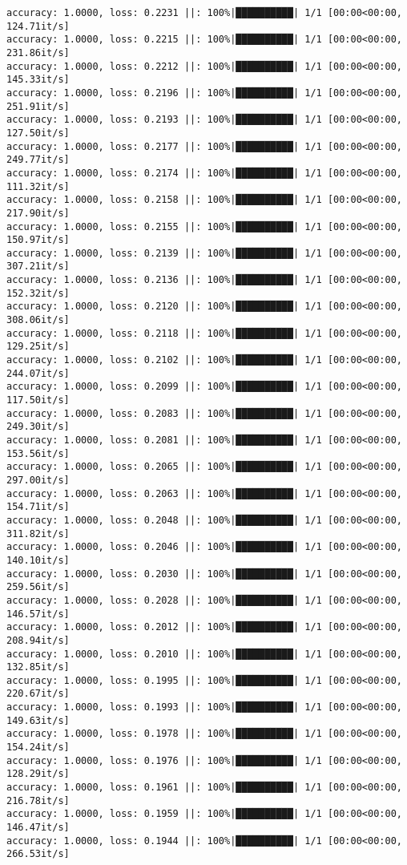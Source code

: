 \documentclass[
]{article}
\begin{document}
\begin{verbatim}
accuracy: 1.0000, loss: 0.2231 ||: 100%|██████████| 1/1 [00:00<00:00, 124.71it/s]
accuracy: 1.0000, loss: 0.2215 ||: 100%|██████████| 1/1 [00:00<00:00, 231.86it/s]
accuracy: 1.0000, loss: 0.2212 ||: 100%|██████████| 1/1 [00:00<00:00, 145.33it/s]
accuracy: 1.0000, loss: 0.2196 ||: 100%|██████████| 1/1 [00:00<00:00, 251.91it/s]
accuracy: 1.0000, loss: 0.2193 ||: 100%|██████████| 1/1 [00:00<00:00, 127.50it/s]
accuracy: 1.0000, loss: 0.2177 ||: 100%|██████████| 1/1 [00:00<00:00, 249.77it/s]
accuracy: 1.0000, loss: 0.2174 ||: 100%|██████████| 1/1 [00:00<00:00, 111.32it/s]
accuracy: 1.0000, loss: 0.2158 ||: 100%|██████████| 1/1 [00:00<00:00, 217.90it/s]
accuracy: 1.0000, loss: 0.2155 ||: 100%|██████████| 1/1 [00:00<00:00, 150.97it/s]
accuracy: 1.0000, loss: 0.2139 ||: 100%|██████████| 1/1 [00:00<00:00, 307.21it/s]
accuracy: 1.0000, loss: 0.2136 ||: 100%|██████████| 1/1 [00:00<00:00, 152.32it/s]
accuracy: 1.0000, loss: 0.2120 ||: 100%|██████████| 1/1 [00:00<00:00, 308.06it/s]
accuracy: 1.0000, loss: 0.2118 ||: 100%|██████████| 1/1 [00:00<00:00, 129.25it/s]
accuracy: 1.0000, loss: 0.2102 ||: 100%|██████████| 1/1 [00:00<00:00, 244.07it/s]
accuracy: 1.0000, loss: 0.2099 ||: 100%|██████████| 1/1 [00:00<00:00, 117.50it/s]
accuracy: 1.0000, loss: 0.2083 ||: 100%|██████████| 1/1 [00:00<00:00, 249.30it/s]
accuracy: 1.0000, loss: 0.2081 ||: 100%|██████████| 1/1 [00:00<00:00, 153.56it/s]
accuracy: 1.0000, loss: 0.2065 ||: 100%|██████████| 1/1 [00:00<00:00, 297.00it/s]
accuracy: 1.0000, loss: 0.2063 ||: 100%|██████████| 1/1 [00:00<00:00, 154.71it/s]
accuracy: 1.0000, loss: 0.2048 ||: 100%|██████████| 1/1 [00:00<00:00, 311.82it/s]
accuracy: 1.0000, loss: 0.2046 ||: 100%|██████████| 1/1 [00:00<00:00, 140.10it/s]
accuracy: 1.0000, loss: 0.2030 ||: 100%|██████████| 1/1 [00:00<00:00, 259.56it/s]
accuracy: 1.0000, loss: 0.2028 ||: 100%|██████████| 1/1 [00:00<00:00, 146.57it/s]
accuracy: 1.0000, loss: 0.2012 ||: 100%|██████████| 1/1 [00:00<00:00, 208.94it/s]
accuracy: 1.0000, loss: 0.2010 ||: 100%|██████████| 1/1 [00:00<00:00, 132.85it/s]
accuracy: 1.0000, loss: 0.1995 ||: 100%|██████████| 1/1 [00:00<00:00, 220.67it/s]
accuracy: 1.0000, loss: 0.1993 ||: 100%|██████████| 1/1 [00:00<00:00, 149.63it/s]
accuracy: 1.0000, loss: 0.1978 ||: 100%|██████████| 1/1 [00:00<00:00, 154.24it/s]
accuracy: 1.0000, loss: 0.1976 ||: 100%|██████████| 1/1 [00:00<00:00, 128.29it/s]
accuracy: 1.0000, loss: 0.1961 ||: 100%|██████████| 1/1 [00:00<00:00, 216.78it/s]
accuracy: 1.0000, loss: 0.1959 ||: 100%|██████████| 1/1 [00:00<00:00, 146.47it/s]
accuracy: 1.0000, loss: 0.1944 ||: 100%|██████████| 1/1 [00:00<00:00, 266.53it/s]

\end{verbatim}
\end{document}
